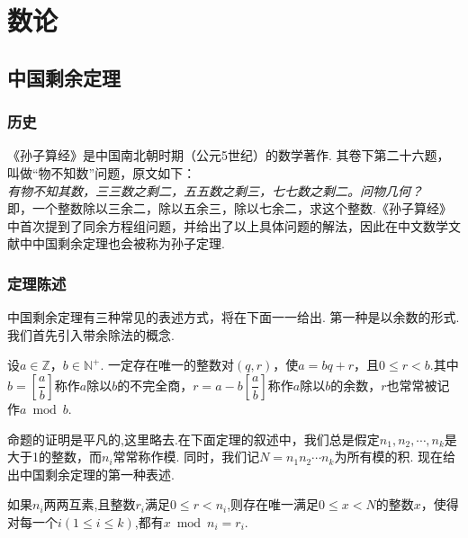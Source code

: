 \documentclass[color=green,mathpazo,titlestyle=hang]{elegantbook}
\author{Huyi Chen}
\begin{document}
\maketitle
\tableofcontents
\mainmatter

\chapter{数论}

\section{中国剩余定理}

\subsection{历史}
《孙子算经》是中国南北朝时期（公元5世纪）的数学著作\cite{sunzi}. 其卷下第二十六题，叫做“物不知数”问题，原文如下：\\ 

\emph{有物不知其数，三三数之剩二，五五数之剩三，七七数之剩二。问物几何？}\\ 


即，一个整数除以三余二，除以五余三，除以七余二，求这个整数.《孙子算经》中首次提到了同余方程组问题，并给出了以上具体问题的解法，因此在中文数学文献中中国剩余定理也会被称为孙子定理.



\subsection{定理陈述}
  中国剩余定理有三种常见的表述方式，将在下面一一给出.
  第一种是以余数的形式.我们首先引入带余除法的概念.
  
  
\begin{newprop}[带余除法]
  设$a\in \mathbb{Z}$，$b\in \mathbb{N^+}$.	一定存在唯一的整数对$(q,r)$，使$a=bq+r$，且$0\leq r< b$.其中$b=\left[\dfrac{a}{b}\right]$称作$a$除以$b$的不完全商，$r=a-b\left[\dfrac{a}{b}\right]$称作$a$除以$b$的余数，$r$也常常被记作$a\bmod b$.
\end{newprop} 

  命题的证明是平凡的,这里略去.在下面定理的叙述中，我们总是假定$n_1,n_2,\cdots,n_k$是大于1的整数，而$n_i$常常称作模. 同时，我们记$N=n_1n_2\cdots n_k$为所有模的积. 现在给出中国剩余定理的第一种表述.
  
  
  \begin{newthem}[中国剩余定理I]
  	如果$n_i$两两互素,且整数$r_i$满足$0\leq r< n_i$,则存在唯一满足$0\leq x <N$的整数$x$，使得对每一个$i(1\leq i \leq k)$,都有$x\bmod n_i=r_i$.
  \end{newthem}
\end{document}
